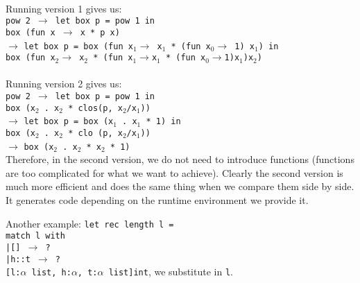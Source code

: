 \documentclass[12 pt]{article}
\newcommand{\mybox}{%
\collectbox{%
	\setlength{\fboxsep}{3pt}%
	\fbox{\BOXCONTENT}%
	}%
}
\begin{document}
         \\ Running version 1 gives us:
         \\ \texttt{pow 2 $\to$ let box p = pow 1 in}
         \\ \phantom{pow 2 $\to$}\hspace{1 em}\texttt{box (fun x $\to$
           x * p x)}
         \\ \phantom{pow 2} $\to$ \texttt{let box p = box (fun x$_1
           \to$ x$_1$ * (fun x$_0 \to$ 1) x$_1$) in}
         \\ \phantom{pow 2 $\to$}\hspace{1 em}\texttt{box (fun
           x$_2\to$ x$_2$ * (fun x$_1 \to$x$_1$ * (fun
           x$_0\to$1)x$_1$)x$_2$)}
         \\
         \\ Running version 2 gives us:
         \\ \texttt{pow 2 $\to$ let box p = pow 1 in}
         \\ \phantom{pow 2 $\to$}\hspace{1 em}\texttt{box (x$_2$ .
           x$_2$ * clos(p, x$_2$/x$_1$))}
         \\ \phantom{pow 2} $\to$ \texttt{let box p = box (x$_1
           $ . x$_1$ * 1) in}
         \\ \phantom{pow 2 $\to$}\hspace{1 em}\texttt{box (x$_2$
           . x$_2$ * clo (p, x$_2$/x$_1$))}
         \\ \phantom{pow 2}$\to$ \texttt{box (x$_2$ . x$_2$ * x$_2$ *
           1)}
         \\
       Therefore, in the second version, we do not need to introduce
functions (functions are too complicated for what we want to
achieve). Clearly the second version is much more efficient and does
the same thing when we compare them side by side. It generates code
depending on the runtime environment we provide it.

       Another example:
       \texttt{let rec length l =}
       \\\phantom{a} \hspace{1 em} \texttt{match l with}
       \\ \phantom{a} \hspace{2 em} \texttt{|[] $\to$ ?}
       \\ \phantom{a} \hspace{2 em} \texttt{|h::t $\to$ \mybox{?}}
       \\ \texttt{[l:$\alpha$ list, h:$\alpha$, t:$\alpha$ list]int},
       we substitute in \texttt{l}.
     
\end{document}
